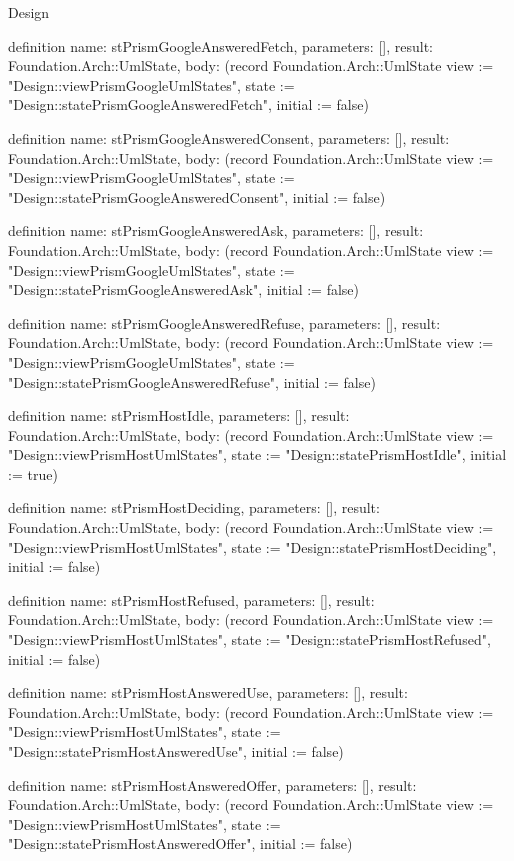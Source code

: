 \begin{lexlean}{Design}
\begin{semanticmodule}
definition{
  name: stPrismGoogleAnsweredFetch,
  parameters: [],
  result: Foundation.Arch::UmlState,
  body: (record Foundation.Arch::UmlState {view := "Design::viewPrismGoogleUmlStates", state := "Design::statePrismGoogleAnsweredFetch", initial := false})
}

definition{
  name: stPrismGoogleAnsweredConsent,
  parameters: [],
  result: Foundation.Arch::UmlState,
  body: (record Foundation.Arch::UmlState {view := "Design::viewPrismGoogleUmlStates", state := "Design::statePrismGoogleAnsweredConsent", initial := false})
}

definition{
  name: stPrismGoogleAnsweredAsk,
  parameters: [],
  result: Foundation.Arch::UmlState,
  body: (record Foundation.Arch::UmlState {view := "Design::viewPrismGoogleUmlStates", state := "Design::statePrismGoogleAnsweredAsk", initial := false})
}

definition{
  name: stPrismGoogleAnsweredRefuse,
  parameters: [],
  result: Foundation.Arch::UmlState,
  body: (record Foundation.Arch::UmlState {view := "Design::viewPrismGoogleUmlStates", state := "Design::statePrismGoogleAnsweredRefuse", initial := false})
}

definition{
  name: stPrismHostIdle,
  parameters: [],
  result: Foundation.Arch::UmlState,
  body: (record Foundation.Arch::UmlState {view := "Design::viewPrismHostUmlStates", state := "Design::statePrismHostIdle", initial := true})
}

definition{
  name: stPrismHostDeciding,
  parameters: [],
  result: Foundation.Arch::UmlState,
  body: (record Foundation.Arch::UmlState {view := "Design::viewPrismHostUmlStates", state := "Design::statePrismHostDeciding", initial := false})
}

definition{
  name: stPrismHostRefused,
  parameters: [],
  result: Foundation.Arch::UmlState,
  body: (record Foundation.Arch::UmlState {view := "Design::viewPrismHostUmlStates", state := "Design::statePrismHostRefused", initial := false})
}

definition{
  name: stPrismHostAnsweredUse,
  parameters: [],
  result: Foundation.Arch::UmlState,
  body: (record Foundation.Arch::UmlState {view := "Design::viewPrismHostUmlStates", state := "Design::statePrismHostAnsweredUse", initial := false})
}

definition{
  name: stPrismHostAnsweredOffer,
  parameters: [],
  result: Foundation.Arch::UmlState,
  body: (record Foundation.Arch::UmlState {view := "Design::viewPrismHostUmlStates", state := "Design::statePrismHostAnsweredOffer", initial := false})
}


\end{semanticmodule}
\end{lexlean}
